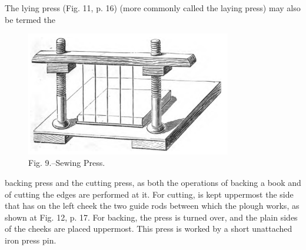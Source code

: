 \documentclass[twoside]{book}
\begin{document}
The lying press (Fig. 11, p. 16) (more commonly
called the laying press) may also be termed the
	\begin{figure}[h]
	\centering
	\includegraphics[width=0.8\textwidth]{Figures/_009.png}
	\caption*{Fig. 9.--Sewing Press.}
	\end{figure}
backing press and the cutting press, as both the
operations of backing a book and of cutting the edges
are performed at it. For cutting, is kept uppermost the
side that has on the left cheek the two guide rods
between which the plough works, as shown at Fig.
12, p. 17. For backing, the press is turned over,
and the plain sides of the cheeks are placed uppermost.
This press is worked by a short unattached
iron press pin.
\end{document}
